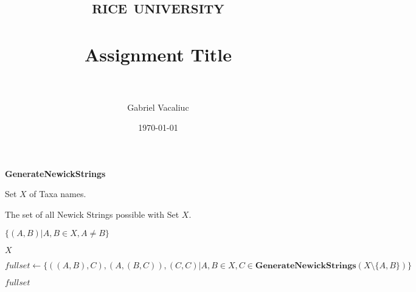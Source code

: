 \documentclass[paper=letter, fontsize=11pt]{scrartcl} %
\title{	
\normalfont \normalsize 
\textsc{rice university} \\ [25pt] %
\horrule{0.5pt} \\[0.4cm] %
\huge Assignment Title \\ %
\horrule{2pt} \\[0.5cm] %
}
\author{Gabriel Vacaliuc} %
\date{\normalsize\today} %
\numberwithin{equation}{section} %
\numberwithin{figure}{section} %
\numberwithin{table}{section} %
\begin{document}
\maketitle %

\begin{algorithm}[h]
\caption{ \textbf{GenerateNewickStrings} }
\label{alg:comp_nni_neigh}
\begin{algorithmic}[5]

    \REQUIRE Set $X$ of Taxa names.

    \ENSURE The set of all Newick Strings possible with Set $X$.

    
        \RETURN $\{(A,B)| A,B \in X, A \neq B\}$
    \ENDIF

        \RETURN $X$ 
    \ENDIF

    \STATE $fullset \leftarrow \{((A,B),C),(A,(B,C)),(C,C)| A,B \in X, C \in
                                    \textbf{GenerateNewickStrings}(X \setminus \{A,B\}) \}$


    \RETURN $fullset$

\end{algorithmic}
\end{algorithm}
\end{document}
